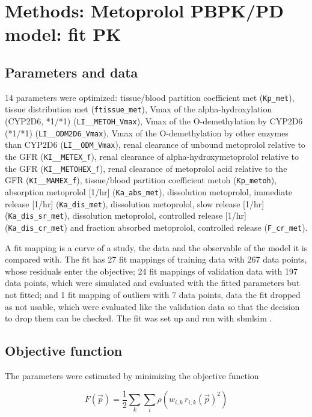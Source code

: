 \section{Methods: Metoprolol PBPK/PD model: fit PK}

\subsection{Parameters and data}

14 parameters were optimized: tissue/blood partition coefficient met (\texttt{Kp\_met}), tissue distribution met (\texttt{ftissue\_met}), Vmax of the alpha-hydroxylation (CYP2D6, *1/*1) (\texttt{LI\_\_METOH\_Vmax}), Vmax of the O-demethylation by CYP2D6 (*1/*1) (\texttt{LI\_\_ODM2D6\_Vmax}), Vmax of the O-demethylation by other enzymes than CYP2D6 (\texttt{LI\_\_ODM\_Vmax}), renal clearance of unbound metoprolol relative to the GFR (\texttt{KI\_\_METEX\_f}), renal clearance of alpha-hydroxymetoprolol relative to the GFR (\texttt{KI\_\_METOHEX\_f}), renal clearance of metoprolol acid relative to the GFR (\texttt{KI\_\_MAMEX\_f}), tissue/blood partition coefficient metoh (\texttt{Kp\_metoh}), absorption metoprolol [1/hr] (\texttt{Ka\_abs\_met}), dissolution metoprolol, immediate release [1/hr] (\texttt{Ka\_dis\_met}), dissolution metoprolol, slow release [1/hr] (\texttt{Ka\_dis\_sr\_met}), dissolution metoprolol, controlled release [1/hr] (\texttt{Ka\_dis\_cr\_met}) and fraction absorbed metoprolol, controlled release (\texttt{F\_cr\_met}).

A fit mapping is a curve of a study, the data and the observable of the model it is compared with. The fit has 27 fit mappings of training data with 267 data points, whose residuals enter the objective; 24 fit mappings of validation data with 197 data points, which were simulated and evaluated with the fitted parameters but not fitted; and 1 fit mapping of outliers with 7 data points, data the fit dropped as not usable, which were evaluated like the validation data so that the decision to drop them can be checked. The fit was set up and run with sbmlsim \cite{Koenig2026_sbmlsim}.

\subsection{Objective function}

The parameters were estimated by minimizing the objective function

\begin{equation}
F(\vec{p}) = \frac{1}{2} \sum_{k} \sum_{i} \rho\left(w_{i,k}\, r_{i,k}(\vec{p})^2\right)
\end{equation}

